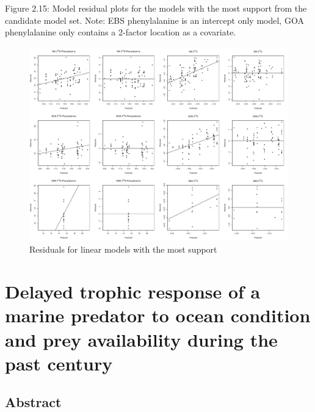 \documentclass [11pt, proquest] {uwthesis}[2015/03/03]
\begin{document}
Figure 2.15: Model residual plots for the models with the most support
from the candidate model set. Note: EBS phenylalanine is an intercept
only model, GOA phenylalanine only contains a 2-factor location as a
covariate. \newline 
\begin{figure}[h]
\centering
  \includegraphics[height=0.8\textwidth]{figure/Ch2/FigureS8.pdf}
  \caption{Residuals for linear models with the most support}
  \label{fig:linresid2}
\end{figure}
\chapter{Delayed trophic response of a marine predator to ocean
condition and prey availability during the past
century}\label{delayed-trophic-response-of-a-marine-predator-to-ocean-condition-and-prey-availability-during-the-past-century}

\section{Abstract}\label{abstract-2}
\end{document}
